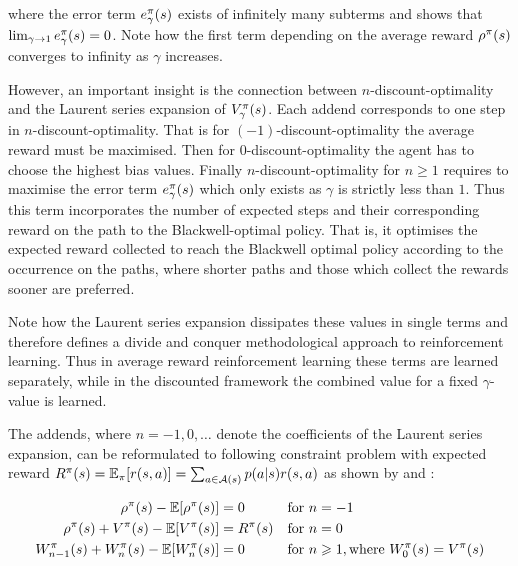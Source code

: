 \documentclass[envcountsame]{llncs}
\begin{document}
where the error term \(e_{\gamma}^{\pi}(s)\) exists of infinitely many subterms and
\citet{Puterman94} shows that \(\lim_{\gamma \to 1} e_{\gamma}^{\pi}(s) = 0\). Note how the first
term depending on the average reward \(\rho^{\pi}(s)\) converges to infinity as \(\gamma\)
increases.


However, an important insight is the connection between \(n\)-discount-optimality and the Laurent
series expansion of \(V_{\gamma}^{\pi}(s)\). Each addend corresponds to one step in
\(n\)-discount-optimality. That is for \((-1)\)-discount-optimality the average reward must be
maximised.
%
Then for \(0\)-discount-optimality the agent has to choose the highest bias values.
%
Finally \(n\)-discount-optimality for \(n \geqslant 1\) requires to maximise the error term
\(e_{\gamma}^{\pi}(s)\) which only exists as \(\gamma\) is strictly less than \(1\). Thus this term
incorporates the number of expected steps and their corresponding reward on the path to the
Blackwell-optimal policy. That is, it optimises the expected reward collected to reach the Blackwell
optimal policy according to the occurrence on the paths, where shorter paths and those which collect
the rewards sooner are preferred.

Note how the Laurent series expansion dissipates these values in single terms and therefore defines
a divide and conquer methodological approach to reinforcement learning. Thus in average reward
reinforcement learning these terms are learned separately, while in the discounted framework the
combined value for a fixed \(\gamma\)-value is learned.

The addends, where \(n=-1,0,\ldots\) denote the coefficients of the Laurent series expansion,
can be reformulated to following constraint problem with expected reward
\(R^{\pi}(s) = \operatorname*{\mathbb{E}}_{\pi}[ r(s, a) ] = \sum_{a \in \mathcal{A}(s)}p(a | s) r(s, a)\) as shown by
\cite{MillerVeinott1969} and \citet[p.346]{Puterman94}:

\begin{align}
  \label{eq:constr1}\rho^{\pi}(s) - \operatorname*{\mathbb{E}}[\rho^{\pi}(s)] & = 0 &  & \text{for } n = -1 \\
  \label{eq:constr2}\rho^{\pi}(s) + V^{\pi}(s) - \operatorname*{\mathbb{E}}[V^{\pi}(s)] & = R^{\pi}(s) && \text{for } n = 0 \\
  \label{eq:constr3}W^{\pi}_{n-1}(s) + W^{\pi}_{n}(s) - \operatorname*{\mathbb{E}}[W^{\pi}_{n}(s)] & = 0 && \text{for } n \geqslant 1, \text{where } W_{0}^{\pi}(s) = V^{\pi}(s)
\end{align}
\end{document}

